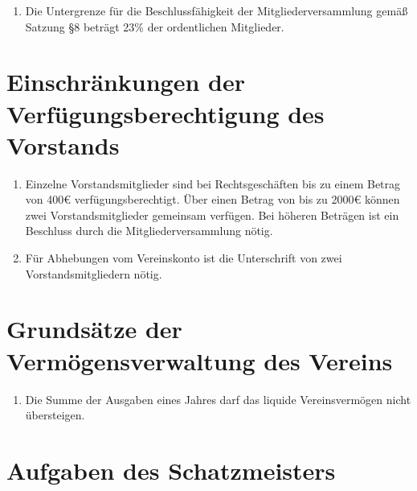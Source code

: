 \documentclass[fontsize=12pt,paper=a4,pagesize,headings=small]{scrartcl}
\begin{document}
\begin{enumerate}
    \item Die Untergrenze für die Beschlussfähigkeit der Mitgliederversammlung
        gemäß Satzung §8 beträgt 23\% der ordentlichen Mitglieder.
\end{enumerate}

\section{Einschränkungen der Verfügungsberechtigung des Vorstands}

\begin{enumerate}
    \item Einzelne Vorstandsmitglieder sind bei Rechtsgeschäften bis zu
        einem Betrag von 400\euro{} verfügungsberechtigt. Über einen Betrag
        von bis zu 2000\euro{} können zwei Vorstandsmitglieder gemeinsam
        verfügen. Bei höheren Beträgen ist ein Beschluss durch die
        Mitgliederversammlung nötig.

    \item Für Abhebungen vom Vereinskonto ist die Unterschrift von zwei
        Vorstandsmitgliedern nötig.

\end{enumerate}

\section{Grundsätze der Vermögensverwaltung des Vereins}

\begin{enumerate}
    \item Die Summe der Ausgaben eines Jahres darf das liquide
            Vereinsvermögen nicht übersteigen.
\end{enumerate}

\section{Aufgaben des Schatzmeisters}
\end{document}
